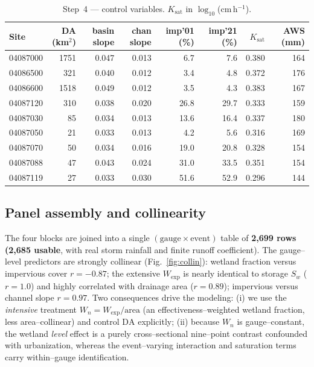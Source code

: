 \documentclass[11pt]{article}
\begin{document}
\begin{table}[htbp]\centering
\caption{Step~4 --- control variables. $K_{\text{sat}}$ in $\log_{10}$(cm\,h$^{-1}$).}
\label{tab:ctrl}
\small
\begin{tabular}{lrrrrrrr}
\toprule
Site & DA (km$^2$) & basin slope & chan slope & imp'01 (\%) & imp'21 (\%) & $K_{\text{sat}}$ & AWS (mm) \\
\midrule
04087000 & 1751 & 0.047 & 0.013 & 6.7  & 7.6  & 0.380 & 164 \\
04086500 & 321  & 0.040 & 0.012 & 3.4  & 4.8  & 0.372 & 176 \\
04086600 & 1518 & 0.049 & 0.012 & 3.5  & 4.3  & 0.383 & 167 \\
04087120 & 310  & 0.038 & 0.020 & 26.8 & 29.7 & 0.333 & 159 \\
04087030 & 85   & 0.034 & 0.013 & 13.6 & 16.4 & 0.337 & 180 \\
04087050 & 21   & 0.033 & 0.013 & 4.2  & 5.6  & 0.316 & 169 \\
04087070 & 50   & 0.034 & 0.016 & 19.0 & 20.8 & 0.328 & 154 \\
04087088 & 47   & 0.043 & 0.024 & 31.0 & 33.5 & 0.351 & 154 \\
04087119 & 27   & 0.033 & 0.030 & 51.6 & 52.9 & 0.296 & 144 \\
\bottomrule
\end{tabular}
\end{table}

\subsection{Panel assembly and collinearity}
The four blocks are joined into a single $(\text{gauge}\times\text{event})$ table of
\textbf{2{,}699 rows (2{,}685 usable}, with real storm rainfall and finite runoff
coefficient). The gauge--level predictors are strongly collinear
(Fig.~\ref{fig:collin}): wetland fraction versus impervious cover $r=-0.87$; the extensive
$W_{\exp}$ is nearly identical to storage $S_w$ ($r=1.0$) and highly correlated with drainage
area ($r=0.89$); impervious versus channel slope $r=0.97$. Two consequences drive the
modeling: (i) we use the \emph{intensive} treatment $W_n=W_{\exp}/\text{area}$ (an
effectiveness--weighted wetland fraction, less area--collinear) and control $\mathrm{DA}$
explicitly; (ii) because $W_n$ is gauge--constant, the wetland \emph{level} effect is a
purely cross--sectional nine--point contrast confounded with urbanization, whereas the
event--varying interaction and saturation terms carry within--gauge identification.
\end{document}
